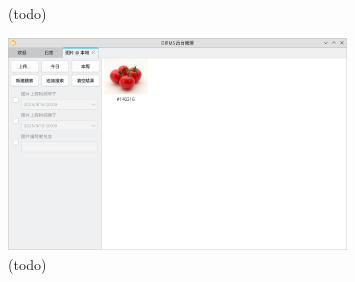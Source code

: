 \begin{figure}[htbp]
    \hfill
	\caption{(todo)}
	\label{fig:rma-im-add}
\end{figure}

\begin{figure}[htbp]
	\centering
	\includegraphics[width=0.8\textwidth]{./exp/rma-im-as.png}
	\caption{(todo)}
	\label{fig:rma-im-as}
\end{figure}

